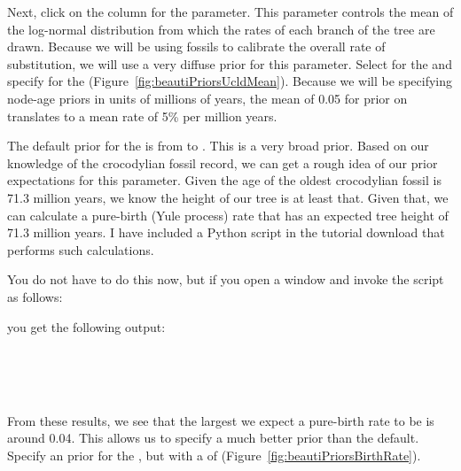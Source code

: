 {    Next, click on the  column for the
     parameter.
    This parameter controls the mean of the log-normal distribution from which
    the rates of each branch of the tree are drawn.
    Because we will be using fossils to calibrate the overall rate of substitution,
    we will use a very diffuse prior for this parameter.
    Select  for the 
    and specify  for the 
    (Figure~\ref{fig:beautiPriorsUcldMean}).
    Because we will be specifying node-age priors in units of millions of
    years, the mean of 0.05 for prior on 
    translates to a mean rate of 5\% per million years.


    The default prior for the 
    is  from  to .
    This is a very broad prior.
    Based on our knowledge of the crocodylian fossil record, we can get
    a rough idea of our prior expectations for this parameter.
    Given the age of the oldest crocodylian fossil is 71.3 million
    years, we know the height of our tree is at least that.
    Given that, we can calculate a pure-birth (Yule process) rate that has an
    expected tree height of 71.3 million years.
    I have included a Python script  in the tutorial
    download that performs such calculations.

    You do not have to do this now, but if you open a 
    window and invoke the script as follows:

    \hspace{1cm}

    you get the following output:

    \\
    \\
    \\

    From these results, we see that the largest we expect a pure-birth rate to
    be is around 0.04.
    This allows us to specify a much better prior than the default.
    Specify an  prior for the
    , but with a  of
     (Figure~\ref{fig:beautiPriorsBirthRate}).

}

